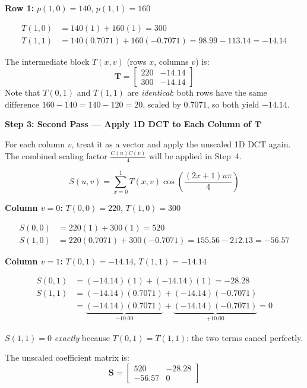 \begin{examplebox}
\noindent
\textbf{Row 1:} $p(1,0)=140$, $p(1,1)=160$

\begin{align*}
T(1,0) &= 140(1) + 160(1) = 300 \\
T(1,1) &= 140(0.7071) + 160(-0.7071) = 98.99 - 113.14 = -14.14
\end{align*}

\noindent
The intermediate block $T(x,v)$ (rows $x$, columns $v$) is:
\[
\mathbf{T} = \begin{bmatrix}
220 & -14.14 \\
300 & -14.14
\end{bmatrix}
\]
Note that $T(0,1)$ and $T(1,1)$ are \emph{identical}: both rows have the same
difference $160-140 = 140-120 = 20$, scaled by $0.7071$, so both yield
$-14.14$.

\medskip
\noindent
\textbf{\large Step 3: Second Pass --- Apply 1D DCT to Each Column of $\mathbf{T}$}

For each column $v$, treat it as a vector and apply the unscaled 1D DCT again.
The combined scaling factor $\frac{C(u)C(v)}{4}$ will be applied in Step~4.

\[
S(u,v) = \sum_{x=0}^{1} T(x,v) \cos\!\left(\frac{(2x+1)u\pi}{4}\right)
\]

\noindent
\textbf{Column $v=0$:} $T(0,0)=220$, $T(1,0)=300$

\begin{align*}
S(0,0) &= 220(1) + 300(1) = 520 \\
S(1,0) &= 220(0.7071) + 300(-0.7071) = 155.56 - 212.13 = -56.57
\end{align*}

\noindent
\textbf{Column $v=1$:} $T(0,1)=-14.14$, $T(1,1)=-14.14$

\begin{align*}
S(0,1) &= (-14.14)(1) + (-14.14)(1) = -28.28 \\[4pt]
S(1,1) &= (-14.14)(0.7071) + (-14.14)(-0.7071) \\
       &= \underbrace{(-14.14)(0.7071)}_{-10.00} + \underbrace{(-14.14)(-0.7071)}_{+10.00} = 0
\end{align*}

$S(1,1)=0$ \emph{exactly} because $T(0,1)=T(1,1)$: the two terms cancel perfectly.

The unscaled coefficient matrix is:
\[
\mathbf{S} = \begin{bmatrix}
520 & -28.28 \\
-56.57 & 0
\end{bmatrix}
\]


\end{examplebox}
